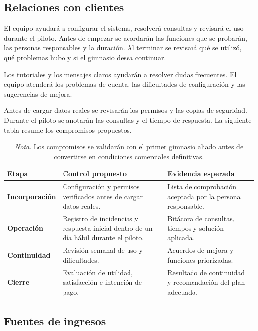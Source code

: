 \subsection{Relaciones con clientes}

El equipo ayudará a configurar el sistema, resolverá consultas y revisará el
uso durante el piloto. Antes de empezar se acordarán las funciones que se
probarán, las personas responsables y la duración. Al terminar se revisará qué
se utilizó, qué problemas hubo y si el gimnasio desea continuar.

Los tutoriales y los mensajes claros ayudarán a resolver dudas frecuentes.
El equipo atenderá los problemas de cuenta, las dificultades de configuración
y las sugerencias de mejora.

Antes de cargar datos reales se revisarán los permisos y las copias de
seguridad. Durante el piloto se anotarán las consultas y el tiempo de respuesta.
La siguiente tabla resume los compromisos propuestos.

\begin{table}[htbp]
\caption{Seguimiento inicial de la calidad del servicio}
\begin{tabularx}{\textwidth}{>{\bfseries}p{3.3cm}X X}
\toprule
Etapa & Control propuesto & Evidencia esperada \\
\midrule
Incorporación & Configuración y permisos verificados antes de cargar datos reales. & Lista de comprobación aceptada por la persona responsable. \\
Operación & Registro de incidencias y respuesta inicial dentro de un día hábil durante el piloto. & Bitácora de consultas, tiempos y solución aplicada. \\
Continuidad & Revisión semanal de uso y dificultades. & Acuerdos de mejora y funciones priorizadas. \\
Cierre & Evaluación de utilidad, satisfacción e intención de pago. & Resultado de continuidad y recomendación del plan adecuado. \\
\bottomrule
\end{tabularx}
\caption*{\textit{Nota}. Los compromisos se validarán con el primer gimnasio aliado antes de convertirse en condiciones comerciales definitivas.}
\end{table}

\subsection{Fuentes de ingresos}

